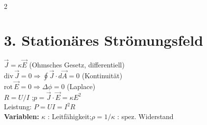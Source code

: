 \documentclass[a4paper, 7.5pt]{extarticle}
\begin{document}
\begin{multicols*}{2}
\section*{3. Stationäres Strömungsfeld}

\begin{tcolorbox}[title={Grundgleichungen \& Einheiten}]
$\vec{J} = \kappa\vec{E}$ \;\text{\textcolor{boxtitle}{[\(A/m^2\)]}}\quad (Ohmsches Gesetz, differentiell)\\
$\text{div}\,\vec{J} = 0 \Rightarrow \oint\vec{J}\cdot d\vec{A} = 0$ \quad (Kontinuität)\\
$\text{rot}\,\vec{E} = 0 \Rightarrow \Delta\phi = 0$ \quad (Laplace)\\
$R = U/I$ \;\text{\textcolor{boxtitle}{[\(\Omega\)]}};\quad $p = \vec{J}\cdot\vec{E} = \kappa E^2$ \;\text{\textcolor{boxtitle}{[\(W/m^3\)]}}\\
Leistung: $P = UI = I^2R$ \;\text{\textcolor{boxtitle}{[\(W\)]}}\\[2pt]
\textbf{Variablen:}\quad
$\kappa$ \;\text{\textcolor{boxtitle}{[\(S/m\)]}}: Leitfähigkeit;\quad $\rho=1/\kappa$ \;\text{\textcolor{boxtitle}{[\(\Omega m\)]}}: spez. Widerstand
\end{tcolorbox}


\end{multicols*}
\end{document}
